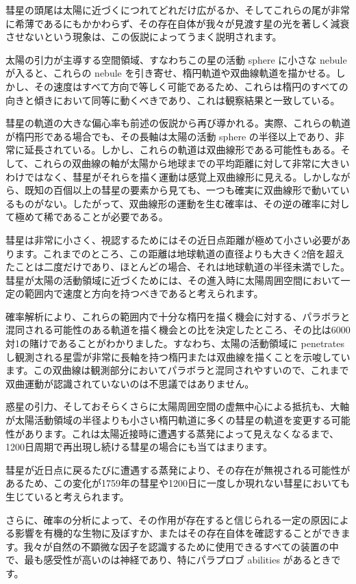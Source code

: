 \documentclass[a4paper,11pt,openany]{ltjsbook}
\begin{document}
彗星の頭尾は太陽に近づくにつれてどれだけ広がるか、そしてこれらの尾が非常に希薄であるにもかかわらず、その存在自体が我々が見渡す星の光を著しく減衰させないという現象は、この仮説によってうまく説明されます。

太陽の引力が主導する空間領域、すなわちこの星の活動 sphere に小さな nebule が入ると、これらの nebule を引き寄せ、楕円軌道や双曲線軌道を描かせる。しかし、その速度はすべて方向で等しく可能であるため、これらは楕円のすべての向きと傾きにおいて同等に動くべきであり、これは観察結果と一致している。

彗星の軌道の大きな偏心率も前述の仮説から再び導かれる。実際、これらの軌道が楕円形である場合でも、その長軸は太陽の活動 sphere の半径以上であり、非常に延長されている。しかし、これらの軌道は双曲線形である可能性もある。そして、これらの双曲線の軸が太陽から地球までの平均距離に対して非常に大きいわけではなく、彗星がそれらを描く運動は感覚上双曲線形に見える。しかしながら、既知の百個以上の彗星の要素から見ても、一つも確実に双曲線形で動いているものがない。したがって、双曲線形の運動を生む確率は、その逆の確率に対して極めて稀であることが必要である。

彗星は非常に小さく、視認するためにはその近日点距離が極めて小さい必要があります。これまでのところ、この距離は地球軌道の直径よりも大きく2倍を超えたことは二度だけであり、ほとんどの場合、それは地球軌道の半径未満でした。彗星が太陽の活動領域に近づくためには、その進入時に太陽周囲空間において一定の範囲内で速度と方向を持つべきであると考えられます。

確率解析により、これらの範囲内で十分な楕円を描く機会に対する、パラボラと混同される可能性のある軌道を描く機会との比を決定したところ、その比は6000対1の賭けであることがわかりました。すなわち、太陽の活動領域に penetrates し観測される星雲が非常に長軸を持つ楕円または双曲線を描くことを示唆しています。この双曲線は観測部分においてパラボラと混同されやすいので、これまで双曲運動が認識されていないのは不思議ではありません。

惑星の引力、そしておそらくさらに太陽周囲空間の虚無中心による抵抗も、大軸が太陽活動領域の半径よりも小さい楕円軌道に多くの彗星の軌道を変更する可能性があります。これは太陽近接時に遭遇する蒸発によって見えなくなるまで、1200日周期で再出現し続ける彗星の場合にも当てはまります。

彗星が近日点に戻るたびに遭遇する蒸発により、その存在が無視される可能性があるため、この変化が1759年の彗星や1200日に一度しか現れない彗星においても生じていると考えられます。

さらに、確率の分析によって、その作用が存在すると信じられる一定の原因による影響を有機的な生物に及ぼすか、またはその存在自体を確認することができます。我々が自然の不顕微な因子を認識するために使用できるすべての装置の中で、最も感受性が高いのは神経であり、特にパラプロブ abilities があるときです。
\end{document}
